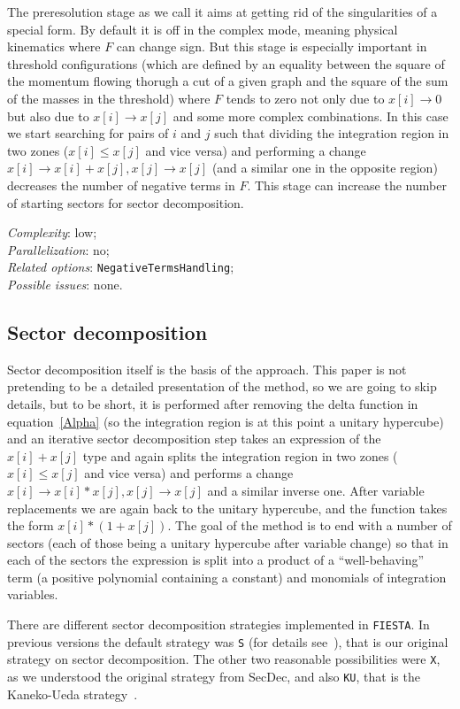 \documentclass[preprint,12pt]{elsarticle}
\begin{document}
The preresolution stage as we call it aims at getting rid of the singularities of a special form. By default it is off in the complex mode, meaning physical kinematics where $F$ can change sign. But this stage is especially important in threshold configurations (which are defined by an equality between the square of the momentum flowing thorugh a cut of a given graph and the square of the sum of the masses in the threshold) where $F$ tends to zero not only due to $x[i] \rightarrow 0$ but also due to $x[i] \rightarrow x[j]$ and some more complex combinations. In this case we start searching for pairs of $i$ and $j$ such that dividing the integration region in two zones ($x[i] \leq x[j]$ and vice versa) and performing a change $x[i] \rightarrow x[i] + x[j], x[j] \rightarrow x[j]$ (and a similar one in the opposite region) decreases the number of negative terms in $F$. This stage can increase the number of starting sectors for sector decomposition.

\textit{Complexity}: low;\\\indent
\textit{Parallelization}: no;\\\indent
\textit{Related options}: {\tt NegativeTermsHandling};\\\indent
\textit{Possible issues}: none.

\subsection{Sector decomposition}
Sector decomposition itself is the basis of the approach. This paper is not pretending to be a detailed presentation of the method, so we are going to skip details, but to be short, it is performed after removing the delta function in equation~\ref{Alpha} (so the integration region is at this point a unitary hypercube) and an iterative sector decomposition step takes an expression of the $x[i] + x[j]$ type and again splits the integration region in two zones ($x[i] \leq x[j]$ and vice versa) and performs a change $x[i] \rightarrow x[i] * x[j], x[j] \rightarrow x[j]$ and a similar inverse one. After variable replacements we are again back to the unitary hypercube, and the function takes the form $x[i] * (1 + x[j])$. The goal of the method is to end with a number of sectors (each of those being a unitary hypercube after variable change) so that in each of the sectors the expression is split into a product of a ``well-behaving'' term (a positive polynomial containing a constant) and monomials of integration variables.

There are different sector decomposition strategies implemented in {\tt FIESTA}. In previous versions the default strategy was {\tt S} (for details see~\cite{Smirnov:2008py}), that is our original strategy on sector decomposition. The other two reasonable possibilities were {\tt X}, as we understood the original strategy from SecDec, and also {\tt KU}, that is the Kaneko-Ueda strategy~\cite{Kaneko:2009qx}.
\end{document}
